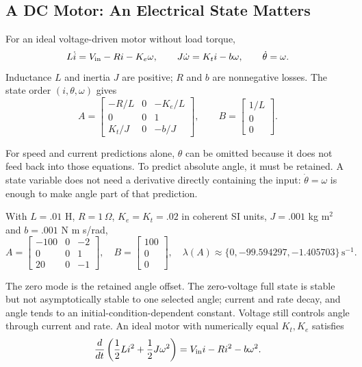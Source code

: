 \subsection{A DC Motor: An Electrical State Matters}
\label{ex:dc_motor}
\label{ex:dcmotor_state}

For an ideal voltage-driven motor without load torque,
\begin{equation}
\label{eq:motor_voltage}
 L\dot i=V_{\rm in}-Ri-K_e\omega,\qquad
 J\dot\omega=K_t i-b\omega,\qquad \dot\theta=\omega.
\end{equation}
\label{eq:motor_torque}
Inductance $L$ and inertia $J$ are positive; $R$ and $b$ are nonnegative losses. The state order $(i,\theta,\omega)$ gives
\begin{equation}
\label{eq:motor_matrices}
 A=\begin{bmatrix}-R/L&0&-K_e/L\\0&0&1\\K_t/J&0&-b/J\end{bmatrix},
 \qquad B=\begin{bmatrix}1/L\\0\\0\end{bmatrix}.
\end{equation}

For speed and current predictions alone, $\theta$ can be omitted because it does not feed back into those equations. To predict absolute angle, it must be retained. A state variable does not need a derivative directly containing the input: $\dot\theta=\omega$ is enough to make angle part of that prediction.

With $L=.01$ H, $R=1\,\Omega$, $K_e=K_t=.02$ in coherent SI units, $J=.001$ kg m$^2$ and $b=.001$ N m s/rad,
\begin{equation}
\label{eq:motor_numeric}
 A=\begin{bmatrix}-100&0&-2\\0&0&1\\20&0&-1\end{bmatrix},
 \quad B=\begin{bmatrix}100\\0\\0\end{bmatrix},
 \quad \lambda(A)\approx\{0,-99.594297,-1.405703\}\,\mathrm{s}^{-1}.
\end{equation}

The zero mode is the retained angle offset. The zero-voltage full state is stable but not asymptotically stable to one selected angle; current and rate decay, and angle tends to an initial-condition-dependent constant. Voltage still controls angle through current and rate. An ideal motor with numerically equal $K_t,K_e$ satisfies
\begin{equation}
\label{eq:motor_power}
 \frac{d}{dt}\left(\frac12Li^2+\frac12J\omega^2\right)
 =V_{\rm in}i-Ri^2-b\omega^2.
\end{equation}

